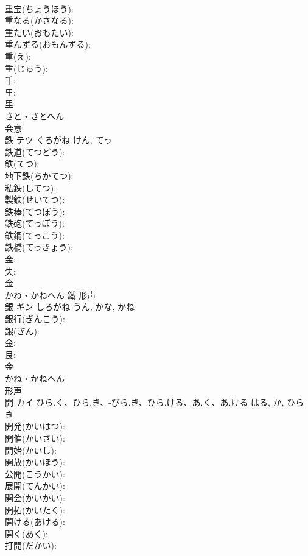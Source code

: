 \documentclass[8pt]{extreport}
\begin{document}
\begin{CJK}{UTF8}{min}
\\	重宝(ちょうほう): 
\\	重なる(かさなる): 
\\	重たい(おもたい): 
\\	重んずる(おもんずる): 
\\	重(え): 
\\	重(じゅう): 
\\	千: 
\\	里: 
\\	里	
\\	さと・さとへん	
\\	会意 
\\	鉄	テツ	くろがね	けん, てっ	
\\	鉄道(てつどう): 
\\	鉄(てつ): 
\\	地下鉄(ちかてつ): 
\\	私鉄(してつ): 
\\	製鉄(せいてつ): 
\\	鉄棒(てつぼう): 
\\	鉄砲(てっぽう): 
\\	鉄鋼(てっこう): 
\\	鉄橋(てっきょう): 
\\	金: 
\\	失: 
\\	金	
\\	かね・かねへん	鐵	形声 
\\	銀	ギン	しろがね	うん, かな, かね	
\\	銀行(ぎんこう): 
\\	銀(ぎん): 
\\	金: 
\\	艮: 
\\	金	
\\	かね・かねへん	
\\	形声 
\\	開	カイ	ひら.く、ひら.き、-びら.き、ひら.ける、あ.く、あ.ける	はる, か, ひらき	
\\	開発(かいはつ): 
\\	開催(かいさい): 
\\	開始(かいし): 
\\	開放(かいほう): 
\\	公開(こうかい): 
\\	展開(てんかい): 
\\	開会(かいかい): 
\\	開拓(かいたく): 
\\	開ける(あける): 
\\	開く(あく): 
\\	打開(だかい): 

\end{CJK}
\end{document}
